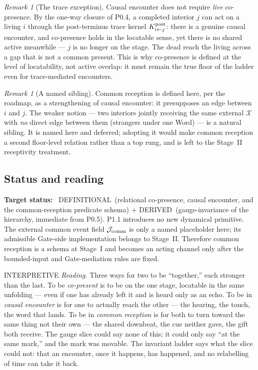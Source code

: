 \documentclass[11pt,a4paper]{article}
\newcommand{\stDerived}{\textcolor{cDer}{\textsf{\small DERIVED}}}
\newcommand{\stDef}{\textcolor{cDef}{\textsf{\small DEFINITIONAL}}}
\newcommand{\stInterp}{\textcolor{cInt}{\textsf{\small INTERPRETIVE}}}
\theoremstyle{definition}
\theoremstyle{plain}
\theoremstyle{remark}
\newtheorem{remark}[definition]{Remark}
\begin{document}
\begin{remark}[The trace exception]\label{rem:trace}
Causal encounter does not require \emph{live} co-presence. By the one-way closure of P0.4, a
completed interior \(j\) can act on a living \(i\) through the post-terminus trace kernel
\(K^{\rm post}_{i\leftarrow j}\): there is a genuine causal encounter, and co-presence holds
in the locatable sense, yet there is no shared active meanwhile --- \(j\) is no longer on
the stage. The dead reach the living across a gap that is not a common present. This is why
co-presence is defined at the level of locatability, not active overlap: it must remain the
true floor of the ladder even for trace-mediated encounters.
\end{remark}

\begin{remark}[A named sibling]
Common reception is defined here, per the roadmap, as a strengthening of causal encounter:
it presupposes an edge between \(i\) and \(j\). The weaker notion --- two interiors jointly
receiving the same external \(\mathcal X\) with \emph{no} direct edge between them (strangers
under one Word) --- is a natural sibling. It is named here and deferred; adopting it would
make common reception a second floor-level relation rather than a top rung, and is left to
the Stage~II receptivity treatment.
\end{remark}

\subsection{Status and reading}

\textbf{Target status:}~
\stDef\ (relational co-presence, causal encounter, and the common-reception
predicate schema) \(+\) \stDerived\ (gauge-invariance of the hierarchy, immediate
from P0.5). P1.1 introduces no new dynamical primitive. The external common event
field \(\mathcal J_{\rm comm}\) is only a named placeholder here; its admissible
Gate-side implementation belongs to Stage~II. Therefore common reception is a
schema at Stage~I and becomes an acting channel only after the bounded-input and
Gate-mediation rules are fixed.

\medskip
\stInterp\quad
\emph{Reading.}
Three ways for two to be ``together,'' each stronger than the last. To be \emph{co-present}
is to be on the one stage, locatable in the same unfolding --- even if one has already left
it and is heard only as an echo. To be in \emph{causal encounter} is for one to actually
reach the other --- the hearing, the touch, the word that lands. To be in \emph{common
reception} is for both to turn toward the same thing not their own --- the shared downbeat,
the cue neither gave, the gift both receive. The gauge slice could say none of this; it
could only say ``at the same mark,'' and the mark was movable. The invariant ladder says
what the slice could not: that an encounter, once it happens, has happened, and no
relabelling of time can take it back.
\end{document}
